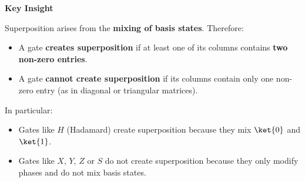 \highspace
\begin{flushleft}
    \textcolor{Green3}{ \textbf{Key Insight}}
\end{flushleft}
Superposition arises from the \textbf{mixing of basis states}. Therefore:
\begin{itemize}
    \item A gate \textbf{creates superposition} if at least one of its columns contains \textbf{two non-zero entries}.
    \item A gate \textbf{cannot create superposition} if its columns contain only one non-zero entry (as in diagonal or triangular matrices).
\end{itemize}
In particular:
\begin{itemize}
    \item Gates like $H$ (Hadamard) create superposition because they mix $\ket{0}$ and $\ket{1}$.
    \item Gates like $X$, $Y$, $Z$ or $S$ do not create superposition because they only modify phases and do not mix basis states.
\end{itemize}

